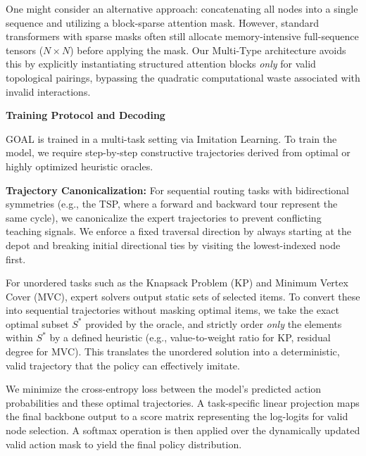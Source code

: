 \vspace{0.5em}
\noindent One might consider an alternative approach: concatenating all nodes into a single sequence and utilizing a block-sparse attention mask. However, standard transformers with sparse masks often still allocate memory-intensive full-sequence tensors ($N \times N$) before applying the mask. Our Multi-Type architecture avoids this by explicitly instantiating structured attention blocks \textit{only} for valid topological pairings, bypassing the quadratic computational waste associated with invalid interactions. 

\vspace{1em}
\noindent\textbf{Training Protocol and Decoding}
\vspace{0.5em}

\noindent GOAL is trained in a multi-task setting via Imitation Learning. To train the model, we require step-by-step constructive trajectories derived from optimal or highly optimized heuristic oracles. 

\vspace{0.5em}
\noindent \textbf{Trajectory Canonicalization:} For sequential routing tasks with bidirectional symmetries (e.g., the TSP, where a forward and backward tour represent the same cycle), we canonicalize the expert trajectories to prevent conflicting teaching signals. We enforce a fixed traversal direction by always starting at the depot and breaking initial directional ties by visiting the lowest-indexed node first.

\vspace{0.5em}
\noindent For unordered tasks such as the Knapsack Problem (KP) and Minimum Vertex Cover (MVC), expert solvers output static sets of selected items. To convert these into sequential trajectories without masking optimal items, we take the exact optimal subset $S^*$ provided by the oracle, and strictly order \textit{only} the elements within $S^*$ by a defined heuristic (e.g., value-to-weight ratio for KP, residual degree for MVC). This translates the unordered solution into a deterministic, valid trajectory that the policy can effectively imitate.

\vspace{0.5em}
\noindent We minimize the cross-entropy loss between the model's predicted action probabilities and these optimal trajectories. A task-specific linear projection maps the final backbone output to a score matrix representing the log-logits for valid node selection. A softmax operation is then applied over the dynamically updated valid action mask to yield the final policy distribution.

